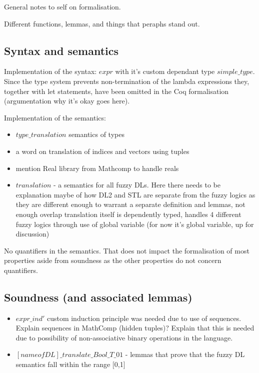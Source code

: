 \documentclass[a4paper,10pt]{article}
\begin{document}
General notes to self on formalisation.

Different functions, lemmas, and things that peraphs stand out.

\subsection{Syntax and semantics}

Implementation of the syntax: $expr$ with it's custom dependant type $simple\_type$. Since the type system prevents non-termination of the lambda expressions they, together with let statements, have been omitted in the Coq formalisation (argumentation why it's okay goes here).



Implementation of the semantics: 
\begin{itemize}
	\item $type\_translation$ semantics of types
	\item a word on translation of indices and vectors using tuples
	\item mention Real library from Mathcomp to handle reals
	\item $translation$ - a semantics for all fuzzy DLs. Here there needs to be explanation maybe of how DL2 and STL are separate from the fuzzy logics as they are different enough to warrant a separate definition and lemmas, not enough overlap
	translation itself is dependently typed, handles 4 different fuzzy logics through use of global variable (for now it's global variable, up for discussion)
	
\end{itemize}

No quantifiers in the semantics. That does not impact the formalisation of most properties aside from soundness as the other properties do not concern quantifiers.

\subsection{Soundness (and associated lemmas)}

\begin{itemize}
	\item $expr\_ind'$ custom induction principle was needed due to use of sequences. Explain sequences in MathComp (hidden tuples)? Explain that this is needed due to possibility of non-associative binary operations in the language.
	\item $[name of DL]\_translate\_Bool\_T\_01$ - lemmas that prove that the fuzzy DL semantics fall within the range [0,1]
\end{itemize}
\end{document}
